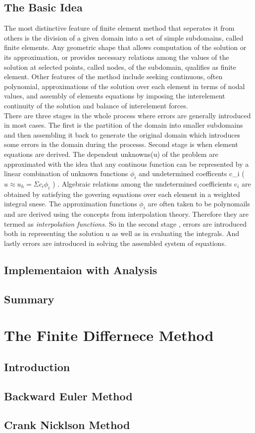\documentclass{report}
\begin{document}
\section{The Basic Idea}
\begin{spacing}{1.5}
The most distinctive feature of finite element method that seperates it from others is the division of a given domain into a set of simple subdomains, called finite elements. Any geometric shape that allows computation of the solution or its approximation, or provides necessary relations among the values of the solution at selected points, called nodes, of the subdomain, qualifies as finite element. Other features of the method include seeking continuous, often polynomial, approximations of the solution over each element in terms of nodal values, and assembly of elements equations by imposing the interelement continuity of the solution and balance of interelement forces.\\
There are three stages in the whole process where errors are generally introduced in most cases. The first is the partition of the domain into smaller subdomains and then assembling it back to generate the original domain which introduces some errors in the domain during the processs. Second stage is when element equations are derived. The dependent unknowns(u) of the problem are approximated with the idea that any continous function can be represented by a linear combination of unknown functions $ \phi_{i} $ and undetermined coefficents c_{i} ( $ u \approx u_{h} = \Sigma {c_{i}\phi_{i}}$ ) . Algebraic relations among the undetermined coefficients  c$_{i}$ are obtained by satisfying the govering equations over each element in a weighted integral snese. The approximation functions $ \phi_{i}$ are often taken to be polynomails and are derived using the concepts from interpolation theory. Therefore they are termed as \textsl{interpolation functions. }So in the second stage , errors are introduced both in representing the solution u as well as in evaluating the integrals. And lastly errors are introduced in solving the assembled system of equations.
\end{spacing}
\section{Implementaion with Analysis}
\section{Summary}
\chapter{The Finite Differnece Method}
\section{Introduction}
\section{Backward Euler Method}
\section{Crank Nicklson Method}
\end{document}

